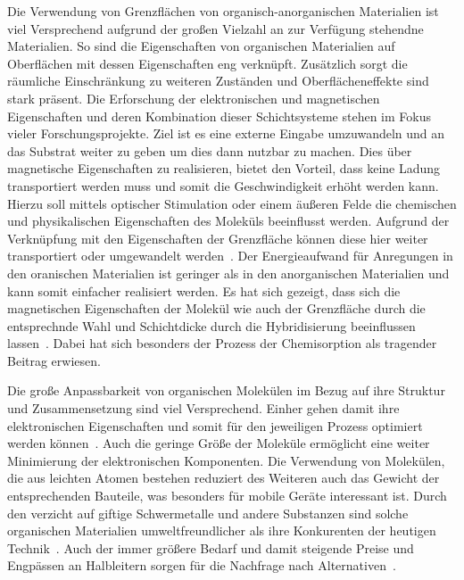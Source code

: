     Die Verwendung von Grenzflächen von organisch-anorganischen Materialien ist viel Versprechend aufgrund der großen Vielzahl an zur Verfügung stehendne Materialien.
    So sind die Eigenschaften von organischen Materialien auf Oberflächen mit dessen Eigenschaften eng verknüpft.
    Zusätzlich sorgt die räumliche Einschränkung zu weiteren Zuständen und Oberflächeneffekte sind stark präsent.
    Die Erforschung der elektronischen und magnetischen Eigenschaften und deren Kombination dieser Schichtsysteme stehen im Fokus vieler Forschungsprojekte.
    Ziel ist es eine externe Eingabe umzuwandeln und an das Substrat weiter zu geben um dies dann nutzbar zu machen.
    Dies über magnetische Eigenschaften zu realisieren, bietet den Vorteil, dass keine Ladung transportiert werden muss und somit die Geschwindigkeit erhöht werden kann.
    Hierzu soll mittels optischer Stimulation oder einem äußeren Felde die chemischen und physikalischen Eigenschaften des Moleküls beeinflusst werden.
    Aufgrund der Verknüpfung mit den Eigenschaften der Grenzfläche können diese hier weiter transportiert oder umgewandelt werden~\cite{IF_16}.
    Der Energieaufwand für Anregungen in den oranischen Materialien ist geringer als in den anorganischen Materialien und kann somit einfacher realisiert werden.
    Es hat sich gezeigt, dass sich die magnetischen Eigenschaften der Molekül wie auch der Grenzfläche durch die entsprechnde Wahl und Schichtdicke durch die Hybridisierung beeinflussen lassen~\cite{IF_16}.
    Dabei hat sich besonders der Prozess der Chemisorption als tragender Beitrag erwiesen.

    Die große Anpassbarkeit von organischen Molekülen im Bezug auf ihre Struktur und Zusammensetzung sind viel Versprechend.
    Einher gehen damit ihre elektronischen Eigenschaften und somit für den jeweiligen Prozess optimiert werden können~\cite{scholl_chapter_2018}.
    Auch die geringe Größe der Moleküle ermöglicht eine weiter Minimierung der elektronischen Komponenten.
    Die Verwendung von Molekülen, die aus leichten Atomen bestehen reduziert des Weiteren auch das Gewicht der entsprechenden Bauteile, was besonders für mobile Geräte interessant ist.
    Durch den verzicht auf giftige Schwermetalle und andere Substanzen sind solche organischen Materialien umweltfreundlicher als ihre Konkurenten der heutigen Technik~\cite{scholl_chapter_2018}.
    Auch der immer größere Bedarf und damit steigende Preise und Engpässen an Halbleitern sorgen für die Nachfrage nach Alternativen~\cite{Idealo}.

